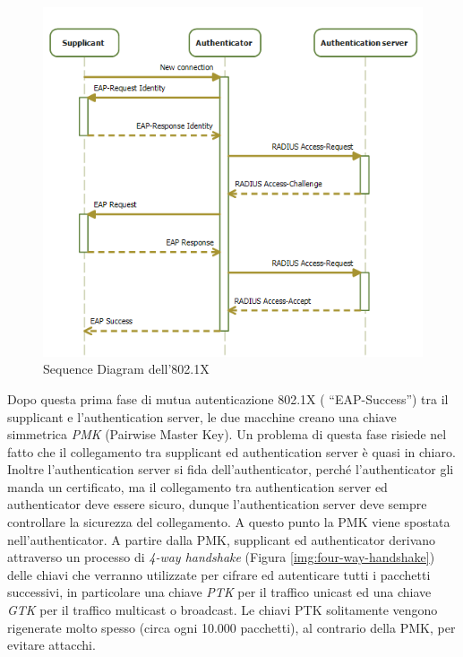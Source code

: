 \begin{figure}[htbp]
	\centering
	\includegraphics[scale = 0.5]{images/802_1X-sequence}
	\caption{Sequence Diagram dell'802.1X}
	\label{img:802_1X-sequence}
\end{figure}

Dopo questa prima fase di mutua autenticazione 802.1X ( “EAP-Success”) tra il supplicant e l'authentication server, le due macchine creano una chiave simmetrica \textit{PMK} (Pairwise Master Key). Un problema di questa fase risiede nel fatto che il collegamento tra supplicant ed authentication server è quasi in chiaro. Inoltre l'authentication server si fida dell'authenticator, perché l'authenticator gli manda un certificato, ma il collegamento tra authentication server ed authenticator deve essere sicuro, dunque l'authentication server deve sempre controllare la sicurezza del collegamento. A questo punto la PMK viene spostata nell'authenticator. A partire dalla PMK, supplicant ed authenticator derivano attraverso un processo di \textit{4-way handshake} (Figura \ref{img:four-way-handshake}) delle chiavi che verranno utilizzate per cifrare ed autenticare tutti i pacchetti successivi, in particolare una chiave \textit{PTK} per il traffico unicast ed una chiave \textit{GTK} per il traffico multicast o broadcast. Le chiavi PTK solitamente vengono rigenerate molto spesso (circa ogni 10.000 pacchetti), al contrario della PMK, per evitare attacchi. \\

